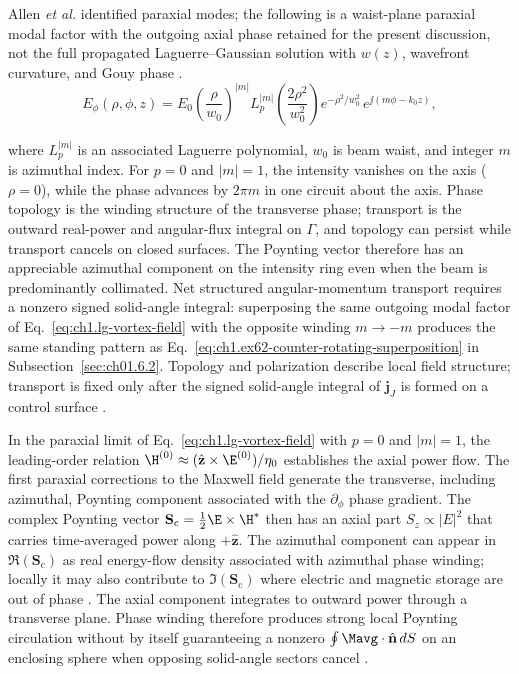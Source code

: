 Allen \emph{et al.} \cite{allen1992} identified paraxial modes; the following is a waist-plane paraxial modal factor with the outgoing axial phase retained for the present discussion, not the full propagated Laguerre--Gaussian solution with $w(z)$, wavefront curvature, and Gouy phase \cite{allen1992}.
\begin{equation}
\label{eq:ch1.phase-winding-number}E_\phi(\rho,\phi,z)
=
E_0
\left(\frac{\rho}{w_0}\right)^{|m|}
L_p^{|m|}\!\left(\frac{2\rho^2}{w_0^2}\right)
e^{-\rho^2/w_0^2}\,
e^{\jj(m\phi-k_0 z)},
\end{equation}
\addtocounter{equation}{-1}\label{eq:ch1.lg-vortex-field}%
where \(L_p^{|m|}\) is an associated Laguerre polynomial, \(w_0\) is beam waist,
and integer \(m\) is azimuthal index. For \(p=0\) and \(|m|=1\), the intensity vanishes
on the axis (\(\rho=0\)), while the phase advances by \(2\pi m\) in one circuit about the axis.
Phase topology is the winding structure of the transverse phase; transport is the outward real-power and angular-flux integral on \(\Gamma\), and topology can persist while transport cancels on closed surfaces. The Poynting vector therefore has an appreciable azimuthal component on the intensity ring even when the beam is predominantly collimated. Net structured angular-momentum transport requires a nonzero signed solid-angle integral: superposing the same outgoing modal factor of Eq.~\eqref{eq:ch1.lg-vortex-field} with the opposite winding $m\to -m$ produces the same standing pattern as
Eq.~\eqref{eq:ch1.ex62-counter-rotating-superposition} in
Subsection~\ref{sec:ch01.6.2}. Topology and polarization describe local field structure; transport is fixed only after the signed solid-angle integral of $\mathbf{j}_J$ is formed on a
control surface \cite{allen1992}.

In the paraxial limit of Eq.~\eqref{eq:ch1.lg-vortex-field} with $p=0$ and $|m|=1$,
the leading-order relation $\H^{(0)}\approx(\hat{\mathbf{z}}\times\E^{(0)})/\eta_0$ establishes the axial power flow.
The first paraxial corrections to the Maxwell field generate the transverse, including azimuthal, Poynting component associated with the $\partial_\phi$ phase gradient.
The complex Poynting vector $\mathbf{S}_\mathrm{c}=\tfrac12\E\times\H^*$ then has an axial part
$S_z\propto |E|^2$ that carries time-averaged power along $+\hat{\mathbf{z}}$.
The azimuthal component can appear in $\Re(\mathbf{S}_\mathrm{c})$ as real energy-flow density associated with azimuthal phase winding; locally it may also contribute to $\Im(\mathbf{S}_\mathrm{c})$ where electric and magnetic storage are out of phase \cite{poynting1884}. The axial component integrates to outward power
through a transverse plane. Phase winding therefore produces strong local Poynting
circulation without by itself guaranteeing a nonzero
$\oint \Mavg\cdot\hat{\mathbf{n}}\,dS$ on an enclosing sphere when opposing
solid-angle sectors cancel \cite{allen1992,poynting1884}.

